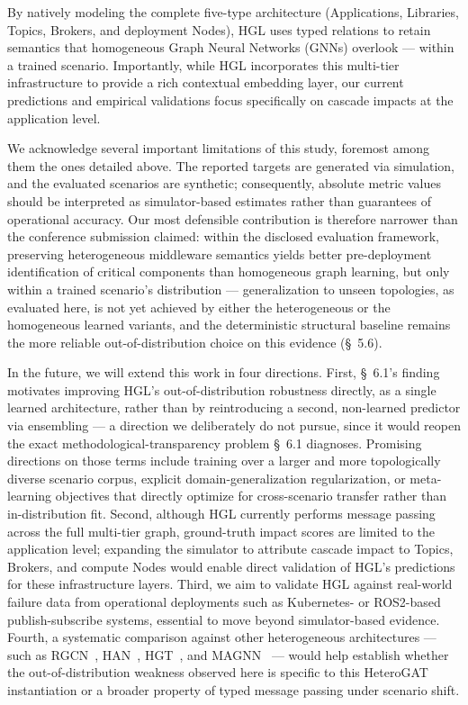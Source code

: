\documentclass[review]{elsarticle}
\begin{document}
By natively modeling the complete five-type architecture (Applications, Libraries, Topics,
Brokers, and deployment Nodes), HGL uses typed relations to retain semantics that homogeneous
Graph Neural Networks (GNNs) overlook --- within a trained scenario. Importantly, while HGL
incorporates this multi-tier infrastructure to provide a rich contextual embedding layer, our
current predictions and empirical validations focus specifically on cascade impacts at the
application level.

We acknowledge several important limitations of this study, foremost among them the ones detailed
above. The reported targets are generated via simulation, and the evaluated scenarios are
synthetic; consequently, absolute metric values should be interpreted as simulator-based estimates
rather than guarantees of operational accuracy. Our most defensible contribution is therefore
narrower than the conference submission claimed: within the disclosed evaluation framework,
preserving heterogeneous middleware semantics yields better pre-deployment identification of
critical components than homogeneous graph learning, but only within a trained scenario's
distribution --- generalization to unseen topologies, as evaluated here, is not yet achieved by
either the heterogeneous or the homogeneous learned variants, and the deterministic structural
baseline remains the more reliable out-of-distribution choice on this evidence (\S~5.6).

In the future, we will extend this work in four directions. First, \S~6.1's finding motivates
improving HGL's out-of-distribution robustness directly, as a single learned architecture, rather
than by reintroducing a second, non-learned predictor via ensembling --- a direction we
deliberately do not pursue, since it would reopen the exact methodological-transparency problem
\S~6.1 diagnoses. Promising directions on those terms include training over a larger and more
topologically diverse scenario corpus, explicit domain-generalization regularization, or
meta-learning objectives that directly optimize for cross-scenario transfer rather than
in-distribution fit. Second, although HGL currently performs message passing across the full
multi-tier graph, ground-truth impact scores are limited to the application level; expanding the
simulator to attribute cascade impact to Topics, Brokers, and compute Nodes would enable direct
validation of HGL's predictions for these infrastructure layers. Third, we aim to validate HGL
against real-world failure data from operational deployments such as Kubernetes- or ROS2-based
publish-subscribe systems, essential to move beyond simulator-based evidence. Fourth, a systematic
comparison against other heterogeneous architectures --- such as RGCN~\cite{Schlichtkrull2018},
HAN~\cite{Wang2019}, HGT~\cite{Hu2020}, and MAGNN~\cite{Fu2020} --- would help establish whether the
out-of-distribution weakness observed here is specific to this HeteroGAT instantiation or a broader
property of typed message passing under scenario shift.
\end{document}
